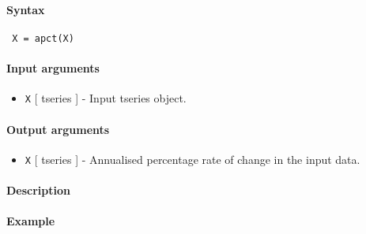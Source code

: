 


	\paragraph{Syntax}
 
 \begin{verbatim}
 X = apct(X)
 \end{verbatim}
 
 \paragraph{Input arguments}
 
 \begin{itemize}
 \item
   \texttt{X} {[} tseries {]} - Input tseries object.
 \end{itemize}
 
 \paragraph{Output arguments}
 
 \begin{itemize}
 \item
   \texttt{X} {[} tseries {]} - Annualised percentage rate of change in
   the input data.
 \end{itemize}
 
 \paragraph{Description}
 
 \paragraph{Example}


